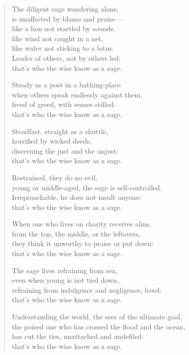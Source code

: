 \documentclass[12pt,openany]{book}%
\begin{document}
\begin{verse}
The diligent sage wandering alone, \\
is unaffected by blame and praise—\\
like a lion not startled by sounds, \\
like wind not caught in a net, \\
like water not sticking to a lotus. \\
Leader of others, not by others led: \\
that’s who the wise know as a sage. 

Steady as a post in a bathing-place \\
when others speak endlessly against them, \\
freed of greed, with senses stilled: \\
that’s who the wise know as a sage. 

Steadfast, straight as a shuttle, \\
horrified by wicked deeds, \\
discerning the just and the unjust: \\
that’s who the wise know as a sage. 

Restrained, they do no evil, \\
young or middle-aged, the sage is self-controlled. \\
Irreproachable, he does not insult anyone: \\
that’s who the wise know as a sage. 

When one who lives on charity receives alms, \\
from the top, the middle, or the leftovers, \\
they think it unworthy to praise or put down: \\
that’s who the wise know as a sage. 

The sage lives refraining from sex, \\
even when young is not tied down, \\
refraining from indulgence and negligence, freed: \\
that’s who the wise know as a sage. 

Understanding the world, the seer of the ultimate goal, \\
the poised one who has crossed the flood and the ocean, \\
has cut the ties, unattached and undefiled: \\
that’s who the wise know as a sage. 


\end{verse}
\end{document}
